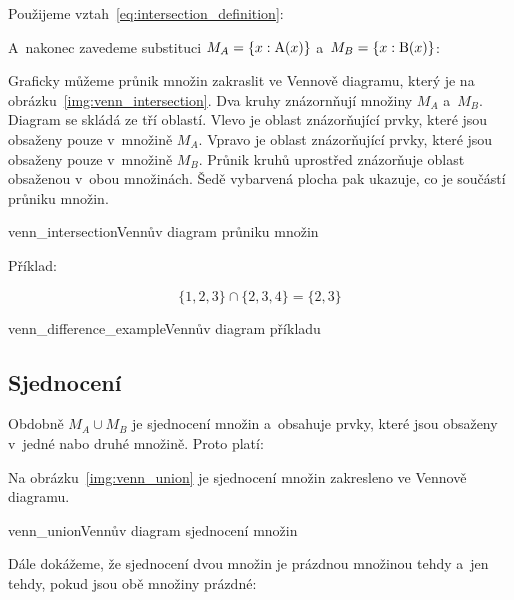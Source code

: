 Použijeme vztah~\eqref{eq:intersection_definition}:

A~nakonec zavedeme substituci \(M_A = \{x: \mathrm{A}(x)\}\) a~\(M_B = \{x: \mathrm{B}(x)\}\):

Graficky můžeme průnik množin zakraslit ve Vennově diagramu, který je na obrázku~\ref{img:venn_intersection}. Dva kruhy znázornňují množiny \(M_A\) a~\(M_B\). Diagram se skládá ze tří oblastí. Vlevo je oblast znázorňující prvky, které jsou obsaženy pouze v~množině \(M_A\). Vpravo je oblast znázorňující prvky, které jsou obsaženy pouze v~množině \(M_B\). Průnik kruhů uprostřed znázorňuje oblast obsaženou v~obou množinách. Šedě vybarvená plocha pak ukazuje, co je součástí průniku množin.

\begin{fig}{venn_intersection}{Vennův diagram průniku množin}
\end{fig}

Příklad:

\begin{equation}
\{1, 2, 3\} \cap \{2, 3, 4\} = \{2, 3\}
\end{equation}

\begin{fig}{venn_difference_example}{Vennův diagram příkladu}
\end{fig}

\subsection{Sjednocení}

Obdobně \(M_A \cup M_B\) je sjednocení množin a~obsahuje prvky, které jsou obsaženy v~jedné nabo druhé množině. Proto platí:


Na obrázku~\ref{img:venn_union} je sjednocení množin zakresleno ve Vennově diagramu.

\begin{fig}{venn_union}{Vennův diagram sjednocení množin}
\end{fig}

Dále dokážeme, že sjednocení dvou množin je prázdnou množinou tehdy a~jen tehdy, pokud jsou obě množiny prázdné:


